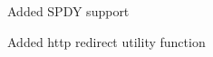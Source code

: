 
\begin{DoxyItemize}
\item Added S\+P\+DY support
\item Added http redirect utility function 
\end{DoxyItemize}